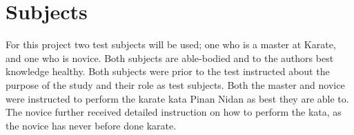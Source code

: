 \section{Subjects}

For this project two test subjects will be used; one who is a master at Karate, and one who is novice. Both subjects are able-bodied and to the authors best knowledge healthy. Both subjects were prior to the test instructed about the purpose of the study and their role as test subjects. Both the master and novice were instructed to perform the karate kata Pinan Nidan as best they are able to. The novice further received detailed instruction on how to perform the kata, as the novice has never before done karate. 